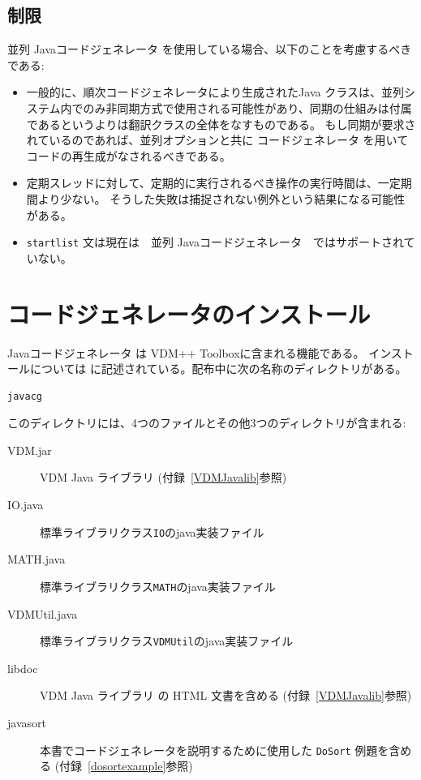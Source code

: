 \documentclass[\pformat,11pt]{jarticle}
\newcommand{\tcg}{コードジェネレータ}
\newcommand{\cg}{Javaコードジェネレータ}
\newcommand{\ccg}{並列 \cg}
\newcommand{\JL}{VDM Java ライブラリ}
\begin{document}
\subsection{制限}
 \ccg{} を使用している場合、以下のことを考慮するべきである:
\begin{itemize}
\item 一般的に、順次コードジェネレータにより生成されたJava クラスは、並列システム内でのみ非同期方式で使用される可能性があり、同期の仕組みは付属であるというよりは翻訳クラスの全体をなすものである。
もし同期が要求されているのであれば、並列オプションと共に \tcg{} を用いてコードの再生成がなされるべきである。

\item 定期スレッドに対して、定期的に実行されるべき操作の実行時間は、一定期間より少ない。
そうした失敗は捕捉されない例外という結果になる可能性がある。

\item  \texttt{startlist} 文は現在は　\ccg　ではサポートされていない。
\end{itemize}


\appendix


\newpage



\newpage
\section{コードジェネレータのインストール}
\label{install}

 \cg{} は VDM++ Toolboxに含まれる機能である。
インストールについては \cite{InstallPPMan-SCSK}に記述されている。配布中に次の名称のディレクトリがある。

\begin{screen}
\begin{verbatim}
javacg
\end{verbatim}
\end{screen}

このディレクトリには、4つのファイルとその他3つのディレクトリが含まれる:

\begin{description}
\item[VDM.jar]  \JL{} (付録~\ref{VDMJavalib}参照)
\item[IO.java]  標準ライブラリクラス{\tt IO}のjava実装ファイル
\item[MATH.java] 標準ライブラリクラス{\tt MATH}のjava実装ファイル
\item[VDMUtil.java] 標準ライブラリクラス{\tt VDMUtil}のjava実装ファイル
\item[libdoc] \JL{} の HTML 文書を含める (付録~\ref{VDMJavalib}参照)
\item[javasort] 本書でコードジェネレータを説明するために使用した \texttt{DoSort} 例題を含める (付録~\ref{dosortexample}参照)
\end{description}
\end{document}
